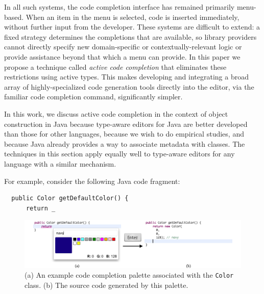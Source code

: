 In all such systems, the code completion interface has remained primarily menu-based. When an item in the menu is selected, code is inserted immediately, without further input from the developer. These systems are difficult to extend: a fixed strategy determines the completions that are available, so library providers cannot directly specify new domain-specific or contextually-relevant logic or provide assistance beyond that which a menu can provide. 
In this paper we propose a technique called {\it active code completion} that eliminates these restrictions using active types. This  makes developing and integrating a broad array of highly-specialized code generation tools directly into the editor, via the familiar code completion command, significantly simpler.%

In this work, we discuss active code completion in the context of object construction in Java because type-aware editors for Java are better developed than those for other languages, because we wish to do empirical studies, and because Java already provides a way to associate metadata with classes. The techniques in this section apply equally well to type-aware editors for any language with a similar mechanism. 

For example, consider the following Java code fragment:

\begin{lstlisting}
  public Color getDefaultColor() {
      return _
\end{lstlisting}

\begin{figure}\label{color}
\begin{center}
\includegraphics[width=40pc]{color_palette.png}\end{center}
\caption{(a) An example code completion palette associated with the \texttt{Color} class. (b) The source code generated by this palette.}
\label{colorpalette}
\end{figure}

